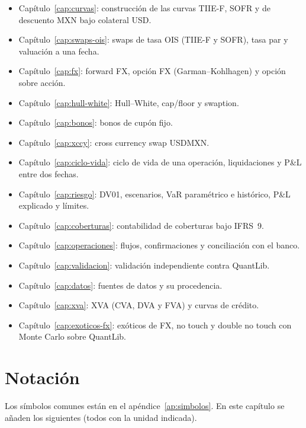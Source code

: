 \begin{sloppypar}
\begin{itemize}
  \item Capítulo~\ref{cap:curvas}: construcción de las curvas TIIE-F, SOFR y de descuento MXN bajo colateral USD.
  \item Capítulo~\ref{cap:swaps-ois}: swaps de tasa OIS (TIIE-F y SOFR), tasa par y valuación a una fecha.
  \item Capítulo~\ref{cap:fx}: forward FX, opción FX (Garman--Kohlhagen) y opción sobre acción.
  \item Capítulo~\ref{cap:hull-white}: Hull--White, cap/floor y swaption.
  \item Capítulo~\ref{cap:bonos}: bonos de cupón fijo.
  \item Capítulo~\ref{cap:xccy}: cross currency swap USDMXN.
  \item Capítulo~\ref{cap:ciclo-vida}: ciclo de vida de una operación, liquidaciones y P\&L entre dos fechas.
  \item Capítulo~\ref{cap:riesgo}: DV01, escenarios, VaR paramétrico e histórico, P\&L explicado y límites.
  \item Capítulo~\ref{cap:coberturas}: contabilidad de coberturas bajo IFRS~9.
  \item Capítulo~\ref{cap:operaciones}: flujos, confirmaciones y conciliación con el banco.
  \item Capítulo~\ref{cap:validacion}: validación independiente contra QuantLib.
  \item Capítulo~\ref{cap:datos}: fuentes de datos y su procedencia.
  \item Capítulo~\ref{cap:xva}: XVA (CVA, DVA y FVA) y curvas de crédito.
  \item Capítulo~\ref{cap:exoticos-fx}: exóticos de FX, no touch y double no touch con Monte Carlo sobre QuantLib.
\end{itemize}

\section{Notación}\label{sec:cap01-notacion}

Los símbolos comunes están en el apéndice~\ref{ap:simbolos}. En este capítulo se añaden los siguientes (todos
con la unidad indicada).


\end{sloppypar}
